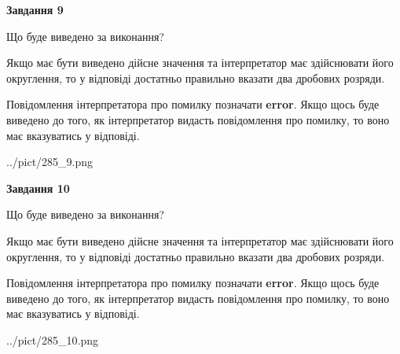 \documentclass[12pt, ukrainian]{article}
\begin{document}
{\begin {Large}
{\begin {center}\textbf{Завдання 9}\end {center}}\par
Що буде виведено за виконання? \par

Якщо має бути виведено дійсне значення та інтерпретатор має здійснювати його округлення, 
то у відповіді достатньо правильно вказати два дробових розряди.

Повідомлення інтерпретатора про помилку позначати \textbf{error}.
Якщо щось буде виведено до того, як інтерпретатор видасть повідомлення про помилку, 
то воно має вказуватись у відповіді. \par

\begin{center}
	{../pict/285_9.png}
\end{center}
\newpage

{\begin {center}\textbf{Завдання 10}\end {center}}\par
Що буде виведено за виконання? \par

Якщо має бути виведено дійсне значення та інтерпретатор має здійснювати його округлення, 
то у відповіді достатньо правильно вказати два дробових розряди.

Повідомлення інтерпретатора про помилку позначати \textbf{error}.
Якщо щось буде виведено до того, як інтерпретатор видасть повідомлення про помилку, 
то воно має вказуватись у відповіді. \par

\begin{center}
	{../pict/285_10.png}
\end{center}
\newpage

\end {Large}}
\end{document}
